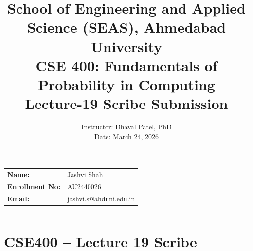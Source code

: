 \documentclass[11pt]{article}
\title{
    \normalsize School of Engineering and Applied Science (SEAS), Ahmedabad University \\
    \vspace{0.2cm}
    \textbf{CSE 400: Fundamentals of Probability in Computing}\\
    \Large Lecture-19 Scribe Submission
}
\author{}
\date{}
\begin{document}
\maketitle

\vspace{-2cm}
\begin{center}
    \begin{tabular}{ll}
        \textbf{Name:} & {Jashvi Shah \hspace{2.5in}} \\ [1.5ex]
        \textbf{Enrollment No:} & {AU2440026 \hspace{2.5in}} \\ [1.5ex]
        \textbf{Email:} & {jashvi.s@ahduni.edu.in \hspace{2.1in}} \\ [1.5ex]
    \end{tabular}
\end{center}

\hrule
\vspace{0.5cm}

\section*{CSE400 – Lecture 19 Scribe}

\date{Instructor: Dhaval Patel, PhD \\ Date: March 24, 2026}
\end{document}
